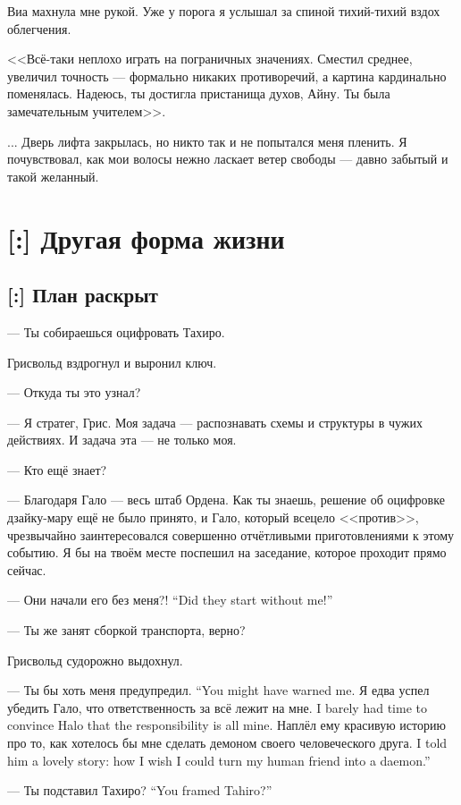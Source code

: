 Виа махнула мне рукой.
Уже у порога я услышал за спиной тихий-тихий вздох облегчения.

<<Всё-таки неплохо играть на пограничных значениях.
Сместил среднее, увеличил точность --- формально никаких противоречий, а картина кардинально поменялась.
Надеюсь, ты достигла пристанища духов, Айну.
Ты была замечательным учителем>>.

... Дверь лифта закрылась, но никто так и не попытался меня пленить.
Я почувствовал, как мои волосы нежно ласкает ветер свободы --- давно забытый и такой желанный.

\chapter{[:] Другая форма жизни}

\section{[:] План раскрыт}

--- Ты собираешься оцифровать Тахиро.

Грисвольд вздрогнул и выронил ключ.

--- Откуда ты это узнал?

--- Я стратег, Грис.
Моя задача --- распознавать схемы и структуры в чужих действиях.
И задача эта --- не только моя.

--- Кто ещё знает?

--- Благодаря Гало --- весь штаб Ордена.
Как ты знаешь, решение об оцифровке дзайку-мару ещё не было принято, и Гало, который всецело <<против>>, чрезвычайно заинтересовался совершенно отчётливыми приготовлениями к этому событию.
Я бы на твоём месте поспешил на заседание, которое проходит прямо сейчас.

{--- Они начали его без меня?!}
{``Did they start without me!''}

--- Ты же занят сборкой транспорта, верно?

Грисвольд судорожно выдохнул.

{--- Ты бы хоть меня предупредил.}
{``You might have warned me.}
{Я едва успел убедить Гало, что ответственность за всё лежит на мне.}
{I barely had time to convince Halo that the responsibility is all mine.}
{Наплёл ему красивую историю про то, как хотелось бы мне сделать демоном своего человеческого друга.}
{I told him a lovely story: how I wish I could turn my human friend into a daemon.''}

{--- Ты подставил Тахиро?}
{``You framed Tahiro?''}

